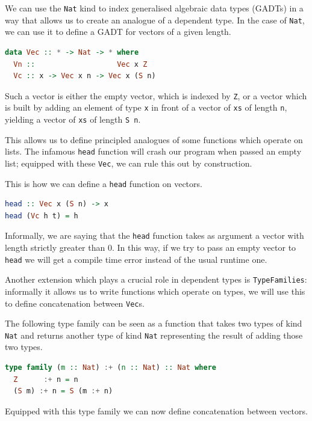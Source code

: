 \documentclass[11pt]{article}
\begin{document}
We can use the \texttt{Nat} kind to index generalised algebraic data
types (GADTs) in a way that allows us to create an analogue of a
dependent type. In the case of \texttt{Nat}, we can use it to define a
GADT for vectors of a given length.

\begin{lstlisting}[language=haskell]
data Vec :: * -> Nat -> * where
  Vn ::                   Vec x Z
  Vc :: x -> Vec x n -> Vec x (S n)
\end{lstlisting}

Such a vector is either the empty vector, which is indexed by
\texttt{Z}, or a vector which is built by adding an element of
type \texttt{x} in front of a vector of \texttt{xs} of length \texttt{n},
yielding a vector of \texttt{xs} of length \texttt{S\ n}.

This allows us to define principled analogues of some functions which
operate on lists. The infamous \texttt{head} function will
crash our program when passed an empty list; equipped with these \texttt{Vec}, we can rule this
out by construction. 

This is how we can define a \texttt{head} function on vectors.

\begin{lstlisting}[language=haskell]
head :: Vec x (S n) -> x
head (Vc h t) = h
\end{lstlisting}

Informally, we are saying that the \texttt{head} function takes as
argument a vector with length strictly greater than 0. In this way, if we
try to pass an empty vector to \texttt{head} we will get a compile time
error instead of the usual runtime one.

Another extension which plays a crucial role in dependent types is
\texttt{TypeFamilies}: informally it allows us to write functions which operate on types, 
we will use this to define concatenation between \texttt{Vec}s.

The following type family can be seen as a function that takes two types
of kind \texttt{Nat} and returns another type of kind \texttt{Nat}
representing the result of adding those two types.

\begin{lstlisting}[language=haskell]
type family (m :: Nat) :+ (n :: Nat) :: Nat where
  Z      :+ n = n
  (S m) :+ n = S (m :+ n)
\end{lstlisting}

Equipped with this type family we can now define concatenation between
vectors.
\end{document}
